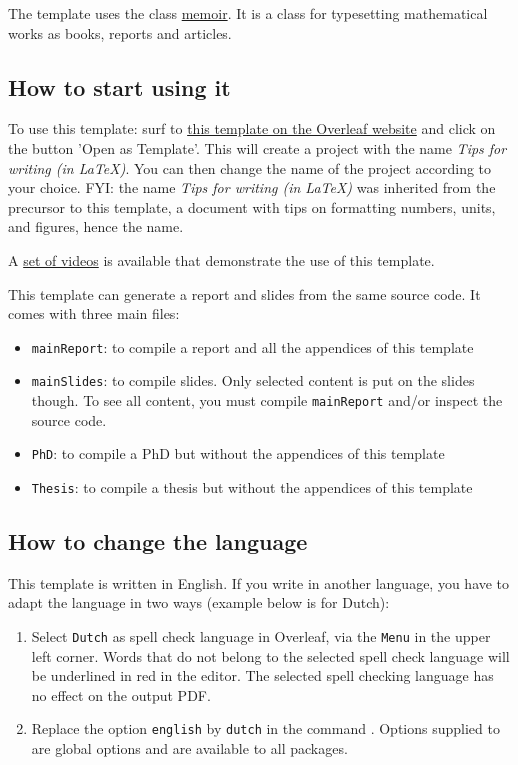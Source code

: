The template uses the class \href{https://ctan.org/pkg/memoir?lang=en}{memoir}. It is a class for typesetting mathematical works as books, reports and articles.

\subsection{How to start using it}
To use this template: surf to \href{https://www.overleaf.com/latex/templates/tips-for-writing-in-latex/kxtvhpxbmdrs}{this template on the Overleaf website} and click on the button 'Open as Template'. This will create a project with the name \textit{Tips for writing (in LaTeX)}. You can then change the name of the project according to your choice. FYI: the name \textit{Tips for writing (in LaTeX)} was inherited from the precursor to this template, a document with tips on formatting numbers, units, and figures, hence the name.

A \href{https://vub.cloud.panopto.eu/Panopto/Pages/Sessions/List.aspx?folderID=eb5cbed1-a7f8-4d08-bca3-ad1e00db8d7a}{set of videos} is available that demonstrate the use of this template.

This template can generate a report and slides from the same source code. It comes with three main files:
\begin{itemize}
    \item \texttt{mainReport}: to compile a report and all the appendices of this template
    \item \texttt{mainSlides}: to compile slides. Only selected content is put on the slides though. To see all content, you must compile \texttt{mainReport} and/or inspect the source code.
    \item \texttt{PhD}: to compile a PhD but without the appendices of this template
    \item \texttt{Thesis}: to compile a thesis but without the appendices of this template
\end{itemize}

\subsection{How to change the language}
This template is written in English. If you write in another language, you have to adapt the language in two ways (example below is for Dutch):
\begin{enumerate}
    \item Select \texttt{Dutch} as spell check language in Overleaf, via the \texttt{Menu} in the upper left corner. Words that do not belong to the selected spell check language will be underlined in red in the editor. The selected spell checking language has no effect on the output PDF. 
    \item Replace the option \texttt{english} by \texttt{dutch} in the command . Options supplied to  are global options and are available to all packages. 
\end{enumerate}

